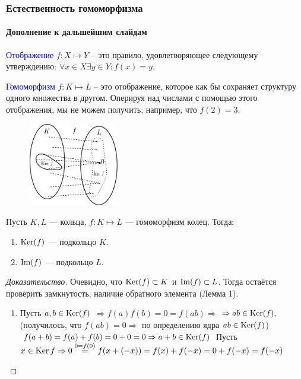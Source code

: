 
\begin{frame}[t]
    \frametitle{\normalsize \bf Естественность гомоморфизма}
    \framesubtitle{Дополнение к дальшейшим слайдам}
    \begin{definition}[Отображение]
        \small
        \textcolor{blue}{Отображение} $f: X \mapsto Y$ -- это правило, удовлетворяющее следующему утверждению: $\forall x \in X \exists y \in Y: f(x) = y$.
    \end{definition}

    \textcolor{blue}{Гомоморфизм} $f: K \mapsto L$ -- это отображение, которое как бы сохраняет структуру одного множества в другом. Оперируя над числами с помощью этого отображения, мы не можем получить, например, что $f(2) = 3$. 

    \begin{figure}[h]
        \centering
        \includegraphics[width=0.35\textwidth]{images/path2}
        \label{fig:path2}
    \end{figure}

\end{frame}

\begin{frame}[t]
    \setcounter{lemma}{2}
    \begin{lemma}
        Пусть $K , L$ — кольца, $f : K \mapsto  L$ --- гомоморфизм колец.
        Тогда:
        \begin{enumerate}
            \item $\operatorname{Ker} (f )$ --- подкольцо $K$.
            \item $\operatorname{Im}(f )$ --- подкольцо $L$.
        \end{enumerate}
    \end{lemma}

    \begin{proof}[Доказательство]
        \renewcommand{\qedsymbol}{}
        Очевидно, что $\operatorname{Ker} (f) \subset K$ и $\operatorname{Im} (f) \subset L$. Тогда остаётся проверить замкнутость, наличие обратного элемента (Лемма 1).
        \begin{enumerate}
            \item Пусть $a,b \in \operatorname{Ker} (f)$ $ \Rightarrow f(a)f(b) = 0 = f(ab) \Rightarrow $ $\Rightarrow ab \in \operatorname{Ker} (f), $ (получилось, что  $f(ab) = 0 \Rightarrow$ по определению ядра $ab \in \operatorname{Ker} (f)$)
                $f(a+b) = f(a) + f(b) = 0 + 0 = 0 \Rightarrow a+b \in \operatorname{Ker} (f)$
            Пусть $x \in \operatorname{Ker} f \Rightarrow 0 \overset{0 = f(0)} = f(x + (-x)) = f(x) + f(-x) = 0 + f(-x) = f(-x)$ 
        \end{enumerate}
    \end{proof}
\end{frame}

